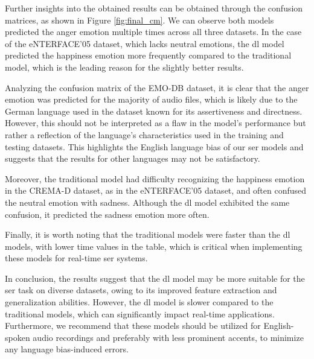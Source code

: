 Further insights into the obtained results can be obtained through the confusion matrices, as shown in Figure \ref{fig:final_cm}. We can observe both models predicted the anger emotion multiple times across all three datasets. In the case of the eNTERFACE'05 dataset, which lacks neutral emotions, the \ac{dl} model predicted the happiness emotion more frequently compared to the traditional model, which is the leading reason for the slightly better results.

Analyzing the confusion matrix of the EMO-DB dataset, it is clear that the anger emotion was predicted for the majority of audio files, which is likely due to the German language used in the dataset known for its assertiveness and directness. However, this should not be interpreted as a flaw in the model's performance but rather a reflection of the language's characteristics used in the training and testing datasets. This highlights the English language bias of our \ac{ser} models and suggests that the results for other languages may not be satisfactory.

Moreover, the traditional model had difficulty recognizing the happiness emotion in the CREMA-D dataset, as in the eNTERFACE'05 dataset, and often confused the neutral emotion with sadness. Although the \ac{dl} model exhibited the same confusion, it predicted the sadness emotion more often.

Finally, it is worth noting that the traditional models were faster than the \ac{dl} models, with lower time values in the table, which is critical when implementing these models for real-time \ac{ser} systems.

In conclusion, the results suggest that the \ac{dl} model may be more suitable for the \ac{ser} task on diverse datasets, owing to its improved feature extraction and generalization abilities. However, the \ac{dl} model is slower compared to the traditional models, which can significantly impact real-time applications. Furthermore, we recommend that these models should be utilized for English-spoken audio recordings and preferably with less prominent accents, to minimize any language bias-induced errors.


